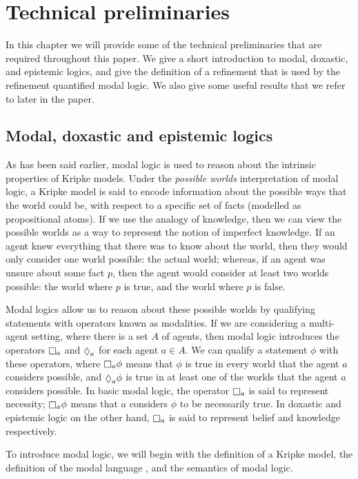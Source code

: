 \chapter{Technical preliminaries}

In this chapter we will provide some of the technical preliminaries that are
required throughout this paper. We give a short introduction to modal, doxastic,
and epistemic logics, and give the definition of a refinement that is used by
the refinement quantified modal logic. We also give some useful results that we
refer to later in the paper.

\section{Modal, doxastic and epistemic logics}

As has been said earlier, modal logic is used to reason about the intrinsic
properties of Kripke models. Under the {\em possible worlds} interpretation of
modal logic, a Kripke model is said to encode information about the possible
ways that the world could be, with respect to a specific set of facts (modelled
as propositional atoms). If we use the analogy of knowledge, then we can view
the possible worlds as a way to represent the notion of imperfect knowledge. If
an agent knew everything that there was to know about the world, then they
would only consider one world possible: the actual world; whereas, if an agent
was unsure about some fact $p$, then the agent would consider at least two
worlds possible: the world where $p$ is true, and the world where $p$ is false.

Modal logics allow us to reason about these possible worlds by qualifying
statements with operators known as modalities. If we are considering a
multi-agent setting, where there is a set $A$ of agents, then modal logic
introduces the operators $\knows_a$ and $\suspects_a$ for each agent $a \in A$.
We can qualify a statement $\phi$ with these operators, where $\knows_a \phi$
means that $\phi$ is true in every world that the agent $a$ considers possible,
and $\suspects_a \phi$ is true in at least one of the worlds that the agent $a$
considers possible. In basic modal logic, the operator $\knows_a$ is said to
represent necessity; $\knows_a \phi$ means that $a$ considers $\phi$ to be
necessarily true. In doxastic and epistemic logic on the other hand, $\knows_a$
is said to represent belief and knowledge respectively.

To introduce modal logic, we will begin with the definition of a Kripke model,
the definition of the modal language \lang{}, and the semantics of modal logic.

